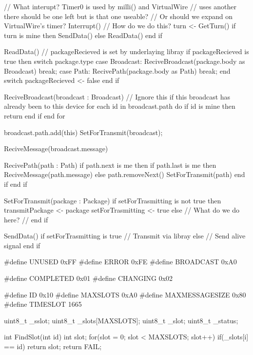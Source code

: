 // What interupt? Timer0 is used by milli() and VirtualWire 
// uses another there should be one left but is that one useable? 
// Or should we expand on VirtualWire's timer?
Interrupt()
    // How do we do this?
    turn <- GetTurn()
    if turn is mine then
        SendData()
    else
        ReadData()
    end if

ReadData()
    // packageRecieved is set by underlaying libray
    if packageRecieved is true then
        switch package.type
            case Broadcast:
                ReciveBroadcast(package.body as Broadcast)
                break;
            case Path:
                RecivePath(package.body as Path)
                break;
        end switch
        packageRecieved <- false
    end if
    
ReciveBroadcast(broadcast : Broadcast)
    // Ignore this if this broadcast has already been to this device
    for each id in broadcast.path do
        if id is mine then
            return
        end if
    end for

    broadcast.path.add(this)
    SetForTransmit(broadcast);
    
    ReciveMessage(broadcast.message)

RecivePath(path : Path)
    if path.next is me then        
        if path.last is me then
            ReciveMessage(path.message)
        else
            path.removeNext()
            SetForTransmit(path)
        end if
    end if
     
SetForTransmit(package : Package)
    if setForTrasmitting is not true then 
        transmitPackage <- package
        setForTrasmitting <- true
    else
        // What do we do here?
        // 
    end if
    
SendData()
    if setForTrasmitting is true
        // Transmit via libray
    else
        // Send alive signal
    end if
    

#define UNUSED          0xFF
#define ERROR           0xFE
#define BROADCAST       0xA0

#define COMPLETED       0x01
#define CHANGING        0x02

#define ID              0x10
#define MAXSLOTS        0xA0
#define MAXMESSAGESIZE  0x80
#define TIMESLOT        1665

uint8_t _sslot;
uint8_t _slots[MAXSLOTS];
uint8_t _slot;
uint8_t _status;

int FindSlot(int id){
    int slot;
    for(slot = 0; slot < MAXSLOTS; slot++){
        if(_slots[i] == id) {
            return slot;
        }
    }
    return FAIL;
}


